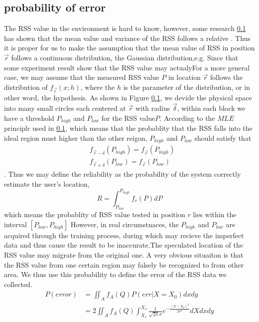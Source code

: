 \documentclass[10pt,conference,compsocconf,letterpaper]{IEEEtran}
\begin{document}
\subsection{probability of error}
The RSS value in the environment is hard to know, however, some research \ref{} has shown that the mean value and variance of the RSS follows a relative . Thus it is proper for us to make the assumption that the mean value of RSS in position $\vec r$ follows a continuous distribution, the Gaussian distribution,e.g. Since that some experiment result show that the RSS value may actualyFor a more general case, we may assume that the measured RSS value $P$ in location $\vec r$ follows the distribution of $f_{\vec r}(x;h)$, where the $h$ is the parameter of the distribution, or in other word, the hypothesis.
As shown in Figure \ref{},  we devide the physical space into many small circles each centered at $\vec r$ with radius $\vec \delta$, within each block we have a threshold  $P_{high}$ and $P_{low}$ for the RSS value$P$.  According to the $MLE$ principlr used in \ref{}, which means that the probablity that the RSS falls into the ideal region must higher than the other reigon, $P_{high}$ and $P_{low}$ should satisfy that 
\begin{equation}
\begin{aligned}
&f_{\vec r-\delta}(P_{high})=f_{\vec r}(P_{high})\\
&f_{\vec r+\delta}(P_{low})=f_{\vec r}(P_{low}) 
\end{aligned}
\end{equation}
. Thus we may define the reliability as the probability of the system correctly estimate the user's location,  
\begin{equation}
R = \int_{{P_{low}}}^{{P_{high}}} {{f_r}(P)dP }
\end{equation}
which means the probablity of RSS value tested in position $r$ lies within the interval $[P_{low},P_{high}]$
However, in real circumstnaces, the $P_{high}$ and $P_{low}$ are acquired through the training process, during which may recieve the imperfect data and thus cause the result to be inaccurate.The speculated location of the RSS value may migrate from the original one.  A very obvious situaiton is that the RSS value from one certain region may falsely be recognized to from other area. We thus use this probability to define the error of the RSS data we collected.
\begin{equation}
\begin{aligned}
P(error) &= \iint_A {{f_A}}(Q)P(err|X = {X_0})dxdy\\
&= 2\iint_A {{f_A}}(Q)\int_{{X_1}}^{{X_2}} {\frac{1}{{\sqrt {2\pi } \sigma }}{e^{ - \frac{{{{(X - {X_0})}^2}}}{{2{\sigma ^2}}}}}} dXdxdy
\end{aligned}
\end{equation}
\end{document}
